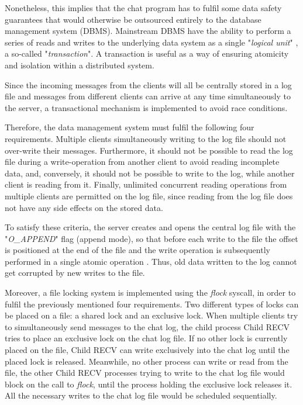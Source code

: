 Nonetheless, this implies that the chat program has to fulfil some data safety guarantees that would otherwise be outsourced entirely to the database management system (DBMS). Mainstream DBMS have the ability to perform a series of reads and writes to the underlying data system as a single "\textit{logical unit}" \cite{Kleppmann2017}, a so-called "\textit{transaction}". A transaction is useful as a way of ensuring atomicity and isolation within a distributed system.

Since the incoming messages from the clients will all be centrally stored in a log file and messages from different clients can arrive at any time simultaneously to the server, a transactional mechanism is implemented to avoid race conditions. 

Therefore, the data management system must fulfil the following four requirements. Multiple clients simultaneously writing to the log file should not over-write their messages. Furthermore, it should not be possible to read the log file during a write-operation from another client to avoid reading incomplete data, and, conversely, it should not be possible to write to the log, while another client is reading from it. Finally, unlimited concurrent reading operations from multiple clients are permitted on the log file, since reading from the log file does not have any side effects on the stored data.

To satisfy these criteria, the server creates and opens the central log file with the "\textit{O\_APPEND}" flag (append mode), so that before each write to the file the offset is positioned at the end of the file and the write operation is subsequently performed in a single atomic operation \cite{Kerrisk2010}. Thus, old data written to the log cannot get corrupted by new writes to the file.

Moreover, a file locking system is implemented using the \textit{flock} syscall, in order to fulfil the previously mentioned four requirements. Two different types of locks can be placed on a file: a shared lock and an exclusive lock. When multiple clients try to simultaneously send messages to the chat log, the child process Child RECV tries to place an exclusive lock on the chat log file.  If no other lock is currently placed on the file, Child RECV can write exclusively into the chat log until the placed lock is released. Meanwhile, no other process can write or read from the file, the other Child RECV processes trying to write to the chat log file would block on the call to \textit{flock}, until the process holding the exclusive lock releases it. All the necessary writes to the chat log file would be scheduled sequentially.

